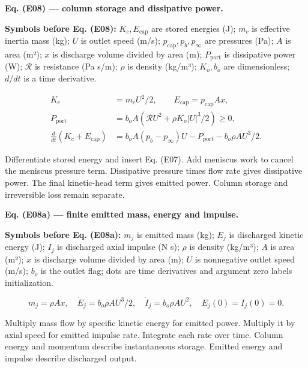 \documentclass[11pt]{article}
\begin{document}
\textbf{Eq. (E08) — column storage and dissipative power.}


\textbf{Symbols before Eq. (E08):} \(K_c,E_{\mathrm{cap}}\) are stored energies (J); \(m_c\) is effective inertia mass (kg); \(U\) is outlet speed (m/s); \(p_{\mathrm{cap}},p_b,p_\infty\) are pressures (Pa); \(A\) is area (m²); \(x\) is discharge volume divided by area (m); \(P_{\mathrm{port}}\) is dissipative power (W); \(\mathcal R\) is resistance (Pa s/m); \(\rho\) is density (kg/m³); \(K_o,b_o\) are dimensionless; \(d/dt\) is a time derivative.



\begin{equation*}
\begin{aligned}
K_c&=m_cU^2/2,\qquad E_{\mathrm{cap}}=p_{\mathrm{cap}}Ax,\\
P_{\mathrm{port}}&=b_oA(\mathcal R U^2+\rho K_o|U|^3/2)\ge0,\\
\frac{d}{dt}(K_c+E_{\mathrm{cap}})&=b_oA(p_b-p_\infty)U-P_{\mathrm{port}}-b_o\rho AU^3/2.
\end{aligned}
\end{equation*}

Differentiate stored energy and insert Eq. (E07). Add meniscus work to cancel the meniscus pressure term. Dissipative pressure times flow rate gives dissipative power. The final kinetic-head term gives emitted power. Column storage and irreversible loss remain separate.


\textbf{Eq. (E08a) — finite emitted mass, energy and impulse.}


\textbf{Symbols before Eq. (E08a):} \(m_j\) is emitted mass (kg); \(E_j\) is discharged kinetic energy (J); \(I_j\) is discharged axial impulse (N s); \(\rho\) is density (kg/m³); \(A\) is area (m²); \(x\) is discharge volume divided by area (m); \(U\) is nonnegative outlet speed (m/s); \(b_o\) is the outlet flag; dots are time derivatives and argument zero labels initialization.



\begin{equation*}
m_j=\rho Ax,\quad \dot E_j=b_o\rho AU^3/2,\quad
\dot I_j=b_o\rho AU^2,\quad E_j(0)=I_j(0)=0.
\end{equation*}

Multiply mass flow by specific kinetic energy for emitted power. Multiply it by axial speed for emitted impulse rate. Integrate each rate over time. Column energy and momentum describe instantaneous storage. Emitted energy and impulse describe discharged output.
\end{document}
